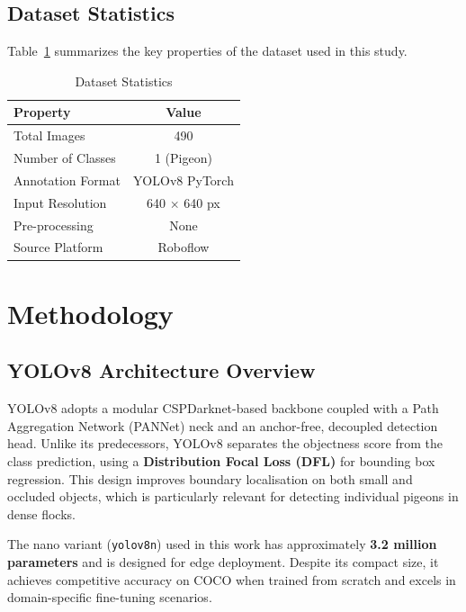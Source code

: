 \documentclass[journal]{IEEEtran}
\begin{document}
\subsection{Dataset Statistics}
Table~\ref{tab:dataset} summarizes the key properties of the dataset used in this study.

\begin{table}[H]
\caption{Dataset Statistics}
\label{tab:dataset}
\centering
\begin{tabular}{lc}
\toprule
\textbf{Property} & \textbf{Value} \\
\midrule
Total Images      & 490 \\
Number of Classes & 1 (Pigeon) \\
Annotation Format & YOLOv8 PyTorch \\
Input Resolution  & 640 $\times$ 640 px \\
Pre-processing    & None \\
Source Platform   & Roboflow \\
\bottomrule
\end{tabular}
\end{table}

\section{Methodology}
\label{sec:method}

\subsection{YOLOv8 Architecture Overview}
YOLOv8 \cite{yolov8_ultralytics} adopts a modular CSPDarknet-based backbone coupled with a Path Aggregation Network (PANNet) neck and an anchor-free, decoupled detection head. Unlike its predecessors, YOLOv8 separates the objectness score from the class prediction, using a \textbf{Distribution Focal Loss (DFL)} for bounding box regression. This design improves boundary localisation on both small and occluded objects, which is particularly relevant for detecting individual pigeons in dense flocks.

The nano variant (\texttt{yolov8n}) used in this work has approximately \textbf{3.2 million parameters} and is designed for edge deployment. Despite its compact size, it achieves competitive accuracy on COCO when trained from scratch and excels in domain-specific fine-tuning scenarios.
\end{document}
